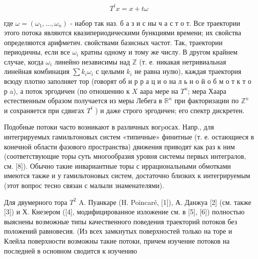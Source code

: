 \documentclass[10pt]{article}
\begin{document}
\[

T^{t} x=x+t \omega

\]



где $\omega=\left(\omega_{1}, \ldots, \omega_{n}\right)$ - набор так наз. б а з и с ны ч а с т о т. Все траектории этого потока являются квазипериодическими бункциями времени; их свойства определяются арифметич. свойствами базисных частот. Так, траектории периодичны, если все $\omega_{i}$ кратны одному и тому же числу. В другом крайнем случае, когда $\omega_{i}$ линейно независимы над $\mathbb{Z}$ (т. е. никакая нетривиальная линейная комбинация $\sum k_{i} \omega_{i}$ с целыми $k_{i}$ не равна нулю), каждая траектория всюду плотно заполняет тор (говорят об и р р а ц и о на л ь н о й о б м о т к т о р a), а поток эргодичен (по отношению к $X$ аара мере на $T^{n}$; мера Хаара естественным образом получается из меры Лебега в $\mathbb{R}^{n}$ при факторизации по $\mathbb{Z}^{n}$ и сохраняется при сдвигах $T^{t}$ ) и даже строго эргодичен; его спектр дискретен.



Подобные потоки часто возникают в различных вогpосах. Напр., для интегрируемых гамильтоновых систем «типичные» финитные (т. е. остающиеся в конечной области фазового пространства) движения приводят как раз к ним (соответствующие торы суть многообразия уровня системы первых интегралов, см. [8]). Обычно такие инвариантные торы с иррациональными обмотками имеются также и у гамильтоновых систем, достаточно близких к интегрируемым (этот вопрос тесно связан с малыли знаменателями).



Для двумерного тора $T^{2}$ A. Пуанкаре (H. Poincaré, [1]), А. Данжуа [2] (см. также [3]) и Х. Кнезером ([4], модифицированное изложение см. в [5], [6]) полностью выяснены возможные типы качественного поведения траекторий потоков без положений равновесия. (Из всех замкнутых поверхностей только на торе и Клейла поверхности возможны такие потоки, причем изучение потоков на последней в основном сводится к изучению
\end{document}
